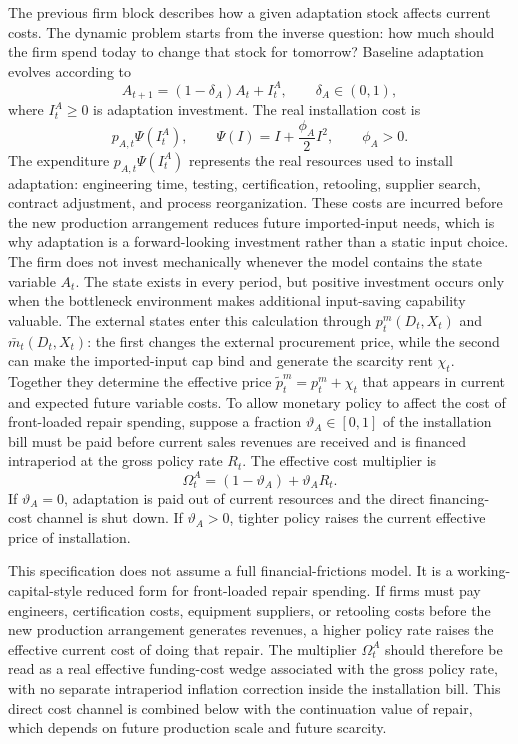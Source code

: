 ﻿\documentclass[12pt]{article}
\theoremstyle{remark}
\begin{document}
The previous firm block describes how a given adaptation stock affects current costs. The dynamic
problem starts from the inverse question: how much should the firm spend today to change that stock
for tomorrow? Baseline adaptation evolves according to
\begin{equation}
    A_{t+1}=(1-\delta_A)A_t+I_t^A,
    \qquad
    \delta_A\in(0,1),
    \label{eq:A_law}
\end{equation}
where $I_t^A\ge 0$ is adaptation investment. The real installation cost is
\begin{equation}
    p_{A,t}\Psi(I_t^A),
    \qquad
    \Psi(I)=I+\frac{\phi_A}{2}I^2,
    \qquad
    \phi_A>0.
    \label{eq:adaptation_cost}
\end{equation}
The expenditure $p_{A,t}\Psi(I_t^A)$ represents the real resources used to install adaptation:
engineering time, testing, certification, retooling, supplier search, contract adjustment, and
process reorganization. These costs are incurred before the new production arrangement reduces
future imported-input needs, which is why adaptation is a forward-looking investment rather than a
static input choice.
The firm does not invest mechanically whenever the model contains the state variable $A_t$.
The state exists in every period, but positive investment occurs only when the bottleneck
environment makes additional input-saving capability valuable. The external states enter this
calculation through $p_t^m(D_t,X_t)$ and $\bar m_t(D_t,X_t)$: the first changes the external
procurement price, while the second can make the imported-input cap bind and generate the
scarcity rent $\chi_t$. Together they determine the effective price
$\tilde p_t^m=p_t^m+\chi_t$ that appears in current and expected future variable costs.
To allow monetary policy to affect the cost of front-loaded repair spending, suppose a fraction
$\vartheta_A\in[0,1]$ of the installation bill must be paid before current sales revenues are
received and is financed intraperiod at the gross policy rate $R_t$. The effective cost multiplier
is
\begin{equation}
    \Omega_t^A=(1-\vartheta_A)+\vartheta_A R_t.
    \label{eq:Omega_A}
\end{equation}
If $\vartheta_A=0$, adaptation is paid out of current resources and the direct financing-cost
channel is shut down. If $\vartheta_A>0$, tighter policy raises the current effective price of
installation.

This specification does not assume a full financial-frictions model. It is a working-capital-style
reduced form for front-loaded repair spending. If firms must pay engineers, certification costs,
equipment suppliers, or retooling costs before the new production arrangement generates revenues,
a higher policy rate raises the effective current cost of doing that repair. The multiplier
$\Omega_t^A$ should therefore be read as a real effective funding-cost wedge associated with the
gross policy rate, with no separate intraperiod inflation correction inside the installation bill.
This direct cost channel is combined below with the continuation value of repair, which depends on
future production scale and future scarcity.
\end{document}
